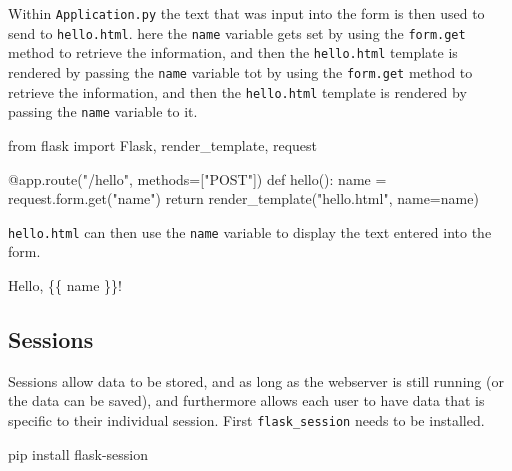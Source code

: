 \documentclass[]{book}
\newenvironment{Shaded}{\begin{snugshade}}{\end{snugshade}}
\newcommand{\StringTok}[1]{\textcolor[rgb]{0.31,0.60,0.02}{#1}}
\newcommand{\BuiltInTok}[1]{#1}
\newcommand{\ExtensionTok}[1]{#1}
\newcommand{\NormalTok}[1]{#1}
\begin{document}
Within \texttt{Application.py} the text that was input into the form is
then used to send to \texttt{hello.html}. here the \texttt{name}
variable gets set by using the \texttt{form.get} method to retrieve the
information, and then the \texttt{hello.html} template is rendered by
passing the \texttt{name} variable tot by using the \texttt{form.get}
method to retrieve the information, and then the \texttt{hello.html}
template is rendered by passing the \texttt{name} variable to it.

\begin{Shaded}
\begin{Highlighting}[]
\ExtensionTok{from}\NormalTok{ flask import Flask, render_template, request}

\ExtensionTok{@app.route}\NormalTok{(}\StringTok{"/hello"}\NormalTok{, methods=[}\StringTok{"POST"}\NormalTok{])             }
\ExtensionTok{def}\NormalTok{ hello()}\BuiltInTok{:}                                       
    \ExtensionTok{name}\NormalTok{ = request.form.get(}\StringTok{"name"}\NormalTok{)                }
    \BuiltInTok{return}\NormalTok{ render_template(}\StringTok{"hello.html"}\NormalTok{, name=name)}
\end{Highlighting}
\end{Shaded}

\texttt{hello.html} can then use the \texttt{name} variable to display
the text entered into the form.

\begin{Shaded}
\begin{Highlighting}[]
\ExtensionTok{Hello}\NormalTok{, \{\{ name \}\}!}
\end{Highlighting}
\end{Shaded}

\subsection{Sessions}\label{sessions}

Sessions allow data to be stored, and as long as the webserver is still
running (or the data can be saved), and furthermore allows each user to
have data that is specific to their individual session. First
\texttt{flask\_session} needs to be installed.

\begin{Shaded}
\begin{Highlighting}[]
\ExtensionTok{pip}\NormalTok{ install flask-session}
\end{Highlighting}
\end{Shaded}
\end{document}
